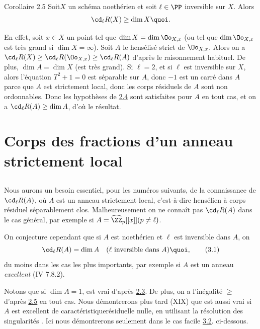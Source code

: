 \documentclass[10pt]{../fichiers-configuration-latex/smfart}
\begin{document}
\begin{enonce*}{Corollaire 2.5}
Soit\pageoriginale $X$ un schéma noethérien et soit $\ell\in
\PP$ inversible sur $X$. Alors
$$
\cd_{\ell}R(X)\geq \dim X{\quoi}.
$$
\end{enonce*}

En effet, soit $x\in X$ un point tel que $\dim X=\dim \Oo_{X,x}$ (ou
tel que $\dim \Oo_{X,x}$ est très grand si $\dim X=\infty$). Soit $A$ le
hensélisé strict de $\Oo_{X,x}$. Alors on a $\cd_{\ell}R(X)\geq
\cd_{\ell}R(\Oo_{X,x})\geq \cd_{\ell}R(A)$ d'après le raisonnement
habituel. De plus, $\dim A=\dim X$ (\resp est très grand). Si
$\ell=2$, et si $\ell$ est inversible sur $X$, alors l'équation
$T^2+1=0$ est séparable sur $A$, donc $-1$ est un carré dans $A$ parce
que $A$ est strictement local, donc les corps résiduels de $A$ sont
non ordonnables. Donc les hypothèses de \hyperref[X.cor2.4]{2.4} sont satisfaites pour $A$
en tout cas, et on a $\cd_{\ell}R(A)\geq \dim A$, d'où le résultat.

\section{Corps des fractions d'un anneau strictement local}

\setcounter{subsection}{-1}
\subsection{}
Nous aurons un besoin essentiel, pour les numéros suivants, de la
connaissance de $\cd_{\ell}R(A)$, où $A$ est un anneau strictement
local, c'est-à-dire hensélien à corps résiduel séparablement
clos. Malheureusement on ne connaît pas $\cd_{\ell}R(A)$ dans le cas
général, par exemple si
$A=\widehat{\ZZ}_p[[x]](p\neq \ell)$.

On conjecture cependant que si $A$ est noethérien et $\ell$ est
inversible dans $A$, on 
\begin{equation*}
\cd_{\ell}R(A)=\dim A\quad (\ell\mbox{ inversible dans } A){\quoi},\tag{3.1}
\end{equation*}
du moins dans les cas les plus importants, par exemple si $A$ est un
anneau \emph{excellent} (\EGA IV 7.8.2).

Notons que si $\dim A=1$,  est vrai d'après \hyperref[X.thm2.3]{2.3}. De plus, on a
l'inégalité $\geq$ d'après \hyperref[X.cor2.5]{2.5} en tout cas. Nous démontrerons plus
tard (XIX) que  est aussi vrai si $A$ est excellent de
caractéristique\pageoriginale résiduelle nulle, en utilisant la
résolution des singularités \cite{3}. Ici nous démontrerons  seulement
dans le cas facile \hyperref[X.prop3.2]{3.2}. ci-dessous.
\end{document}
